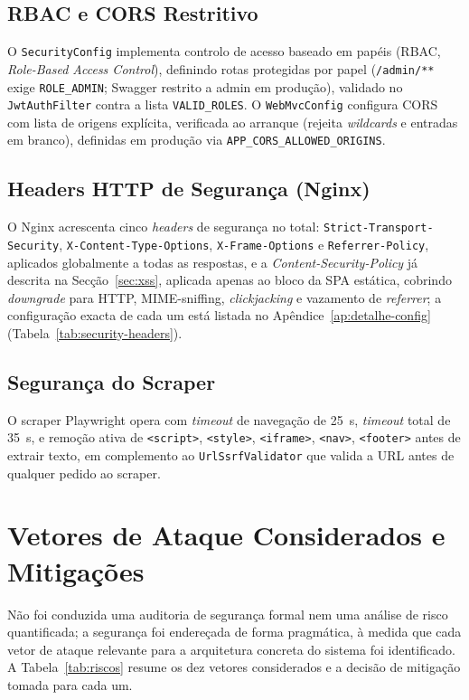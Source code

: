 \subsection*{RBAC e CORS Restritivo}

O \texttt{SecurityConfig} implementa controlo de acesso baseado em papéis (RBAC, \textit{Role-Based Access Control}), definindo rotas protegidas por papel (\texttt{/admin/**} exige \texttt{ROLE\_ADMIN}; Swagger restrito a admin em produção), validado no \texttt{JwtAuthFilter} contra a lista \texttt{VALID\_ROLES}. O \texttt{WebMvcConfig} configura CORS com lista de origens explícita, verificada ao arranque (rejeita \textit{wildcards} e entradas em branco), definidas em produção via \texttt{APP\_CORS\_ALLOWED\_ORIGINS}.

\subsection*{Headers HTTP de Segurança (Nginx)}

O Nginx acrescenta cinco \textit{headers} de segurança no total: \texttt{Strict-Transport-Security}, \texttt{X-Content-Type-Options}, \texttt{X-Frame-Options} e \texttt{Referrer-Policy}, aplicados globalmente a todas as respostas, e a \textit{Content-Security-Policy} já descrita na Secção~\ref{sec:xss}, aplicada apenas ao bloco da SPA estática, cobrindo \textit{downgrade} para HTTP, MIME-sniffing, \textit{clickjacking} e vazamento de \textit{referrer}; a configuração exacta de cada um está listada no Apêndice~\ref{ap:detalhe-config} (Tabela~\ref{tab:security-headers}).

\subsection*{Segurança do Scraper}

O scraper Playwright opera com \textit{timeout} de navegação de 25~s, \textit{timeout} total de 35~s, e remoção ativa de \texttt{<script>}, \texttt{<style>}, \texttt{<iframe>}, \texttt{<nav>}, \texttt{<footer>} antes de extrair texto, em complemento ao \texttt{UrlSsrfValidator} que valida a URL antes de qualquer pedido ao scraper.

\section{Vetores de Ataque Considerados e Mitigações} \label{sec:riscos}

Não foi conduzida uma auditoria de segurança formal nem uma análise de risco quantificada; a segurança foi endereçada de forma pragmática, à medida que cada vetor de ataque relevante para a arquitetura concreta do sistema foi identificado. A Tabela~\ref{tab:riscos} resume os dez vetores considerados e a decisão de mitigação tomada para cada um.

